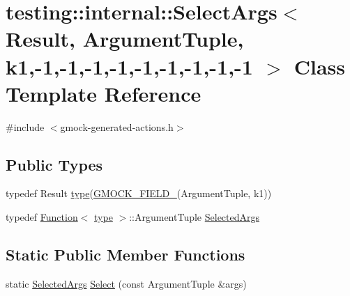 \hypertarget{classtesting_1_1internal_1_1SelectArgs_3_01Result_00_01ArgumentTuple_00_01k1_00-1_00-1_00-1_00-1_00-1_00-1_00-1_00-1_00-1_01_4}{}\section{testing\+:\+:internal\+:\+:Select\+Args$<$ Result, Argument\+Tuple, k1,-\/1,-\/1,-\/1,-\/1,-\/1,-\/1,-\/1,-\/1,-\/1 $>$ Class Template Reference}
\label{classtesting_1_1internal_1_1SelectArgs_3_01Result_00_01ArgumentTuple_00_01k1_00-1_00-1_00-1_00-1_00-1_00-1_00-1_00-1_00-1_01_4}


{\ttfamily \#include $<$gmock-\/generated-\/actions.\+h$>$}

\subsection*{Public Types}
\begin{DoxyCompactItemize}
\item 
typedef Result \hyperlink{classtesting_1_1internal_1_1SelectArgs_3_01Result_00_01ArgumentTuple_00_01k1_00-1_00-1_00-1_00-1_00-1_00-1_00-1_00-1_00-1_01_4_a346a4dc38ca4782a5d17ef3a96a5dc61}{type}(\hyperlink{gmock-generated-actions_8h_a6eb3ce92b0613603057a20ec9e593317}{G\+M\+O\+C\+K\+\_\+\+F\+I\+E\+L\+D\+\_\+}(Argument\+Tuple, k1))
\item 
typedef \hyperlink{structtesting_1_1internal_1_1Function}{Function}$<$ \hyperlink{classtesting_1_1internal_1_1SelectArgs_3_01Result_00_01ArgumentTuple_00_01k1_00-1_00-1_00-1_00-1_00-1_00-1_00-1_00-1_00-1_01_4_a346a4dc38ca4782a5d17ef3a96a5dc61}{type} $>$\+::Argument\+Tuple \hyperlink{classtesting_1_1internal_1_1SelectArgs_3_01Result_00_01ArgumentTuple_00_01k1_00-1_00-1_00-1_00-1_00-1_00-1_00-1_00-1_00-1_01_4_a11dba88063a9b50ec965a42b1f6892c9}{Selected\+Args}
\end{DoxyCompactItemize}
\subsection*{Static Public Member Functions}
\begin{DoxyCompactItemize}
\item 
static \hyperlink{classtesting_1_1internal_1_1SelectArgs_3_01Result_00_01ArgumentTuple_00_01k1_00-1_00-1_00-1_00-1_00-1_00-1_00-1_00-1_00-1_01_4_a11dba88063a9b50ec965a42b1f6892c9}{Selected\+Args} \hyperlink{classtesting_1_1internal_1_1SelectArgs_3_01Result_00_01ArgumentTuple_00_01k1_00-1_00-1_00-1_00-1_00-1_00-1_00-1_00-1_00-1_01_4_aee32b2a3be7b93aa95ab40c455cc9184}{Select} (const Argument\+Tuple \&args)
\end{DoxyCompactItemize}


